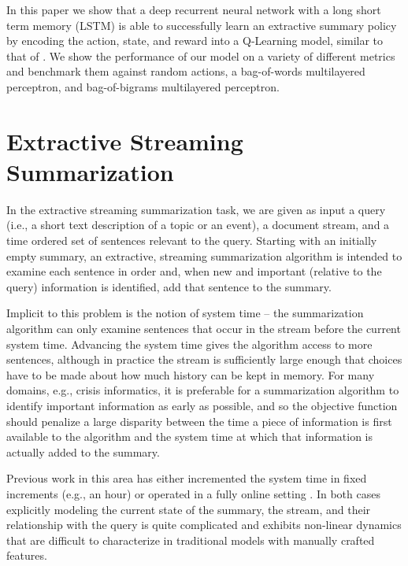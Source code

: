 \documentclass[12pt]{article}
\begin{document}
In this paper we show that a deep recurrent neural network with a long short term memory (LSTM) \cite{hochreiter1997long} is able to successfully learn an extractive summary policy by encoding the action, state, and reward into a Q-Learning model, similar to that of  \cite{hausknecht2015deep}. We show the performance of our model on a variety of different metrics and benchmark them against random actions, a bag-of-words multilayered perceptron, and bag-of-bigrams multilayered perceptron.

\section{Extractive Streaming Summarization}

In the extractive streaming summarization task, we are given as input a query (i.e., a short text description of a topic or an event), a document stream, and a time ordered set of sentences relevant to the query. Starting with an initially empty summary,  an extractive, streaming summarization algorithm is intended to examine each sentence in order and, when new and important (relative to the query) information is identified, add that sentence to the summary. 

Implicit to this problem is the notion of system time -- the summarization algorithm can only examine sentences that occur in the stream before the current system time. Advancing the system time gives the algorithm access to more sentences, although in practice the stream is sufficiently large enough that choices have to be made about how much history can be kept in memory. For many domains, e.g., crisis informatics, it is preferable for a summarization algorithm to identify important information as early as possible, and so the objective function should penalize a large disparity between the time a piece of information is first available to the algorithm and the system time at which that information is actually added to the summary.

Previous work in this area has either incremented the system time in fixed increments (e.g., an hour)  \cite{mccreadie2014incremental, kedzie2015predicting} or operated in a fully online setting \cite{guo2013updating,kedzie2016real}. In both cases explicitly modeling the current state of the summary, the stream, and their relationship with the query is quite complicated and exhibits non-linear dynamics that are difficult to characterize in traditional models with manually crafted features.
\end{document}
